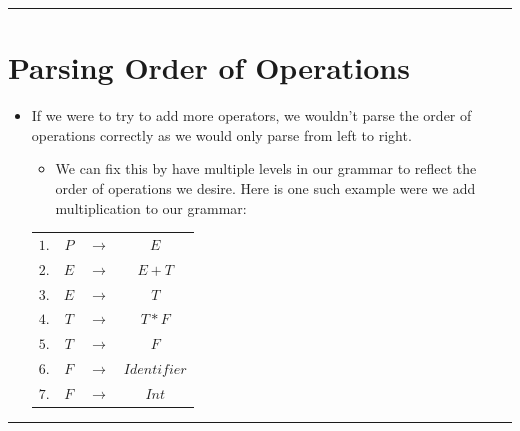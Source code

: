 \documentclass{article}
\begin{document}
\hrule

\section{Parsing Order of Operations}

\begin{itemize}
	\item If we were to try to add more operators, we wouldn't parse the order of operations correctly as we would only parse from left to right.
	\begin{itemize}
		\item We can fix this by have multiple levels in our grammar to reflect the order of operations we desire. Here is one such example were we add multiplication to our grammar:
	\end{itemize}
	\begin{center}
		\begin{tabular}{ |c c c c| }
			\hline
			$1.$ & $P$ & ${\rightarrow}$ & $E$ \\
			$2.$ & $E$ & ${\rightarrow}$ & $E+T$ \\
			$3.$ & $E$ & ${\rightarrow}$ & $T$ \\
			$4.$ & $T$ & ${\rightarrow}$ & $T*F$ \\
			$5.$ & $T$ & ${\rightarrow}$ & $F$ \\
			$6.$ & $F$ & ${\rightarrow}$ & $Identifier$ \\
			$7.$ & $F$ & ${\rightarrow}$ & $Int$ \\
			\hline
		\end{tabular}
	\end{center}
\end{itemize}

\hrule
\end{document}
